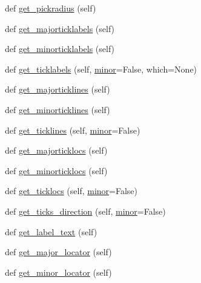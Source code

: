 \begin{DoxyCompactItemize}
def \hyperlink{classmatplotlib_1_1axis_1_1Axis_a15695849391058839321a018f157cbc6}{get\+\_\+pickradius} (self)
\item 
def \hyperlink{classmatplotlib_1_1axis_1_1Axis_a4882da48bc43dd09a7bffa53857cf864}{get\+\_\+majorticklabels} (self)
\item 
def \hyperlink{classmatplotlib_1_1axis_1_1Axis_a10187b66131d717a110edfddeb2d742e}{get\+\_\+minorticklabels} (self)
\item 
def \hyperlink{classmatplotlib_1_1axis_1_1Axis_ae28c6fc8220dc16ef17eef94fd11fb4a}{get\+\_\+ticklabels} (self, \hyperlink{classmatplotlib_1_1axis_1_1Axis_aee64f69c8c9efa6020be9cdefe5dbb49}{minor}=False, which=None)
\item 
def \hyperlink{classmatplotlib_1_1axis_1_1Axis_a388e744fba2303a5961541fef010b3ee}{get\+\_\+majorticklines} (self)
\item 
def \hyperlink{classmatplotlib_1_1axis_1_1Axis_ac2c8891ded3eb3b375d955656da79083}{get\+\_\+minorticklines} (self)
\item 
def \hyperlink{classmatplotlib_1_1axis_1_1Axis_a0c7cf03356111b6d678cf47351910116}{get\+\_\+ticklines} (self, \hyperlink{classmatplotlib_1_1axis_1_1Axis_aee64f69c8c9efa6020be9cdefe5dbb49}{minor}=False)
\item 
def \hyperlink{classmatplotlib_1_1axis_1_1Axis_a22972f3bc63daaeaa6a1a0c249cdb7c3}{get\+\_\+majorticklocs} (self)
\item 
def \hyperlink{classmatplotlib_1_1axis_1_1Axis_a9ac39f662556a99f84dbf2930a54364a}{get\+\_\+minorticklocs} (self)
\item 
def \hyperlink{classmatplotlib_1_1axis_1_1Axis_a56ef3024524d0b2d5acf64f1e805cd99}{get\+\_\+ticklocs} (self, \hyperlink{classmatplotlib_1_1axis_1_1Axis_aee64f69c8c9efa6020be9cdefe5dbb49}{minor}=False)
\item 
def \hyperlink{classmatplotlib_1_1axis_1_1Axis_a783eacedc68213ee0049028681cee753}{get\+\_\+ticks\+\_\+direction} (self, \hyperlink{classmatplotlib_1_1axis_1_1Axis_aee64f69c8c9efa6020be9cdefe5dbb49}{minor}=False)
\item 
def \hyperlink{classmatplotlib_1_1axis_1_1Axis_a9a7813ebd6e79f67fe063e060c5811f6}{get\+\_\+label\+\_\+text} (self)
\item 
def \hyperlink{classmatplotlib_1_1axis_1_1Axis_a482f9779957dcb33a31c85d3894b04ea}{get\+\_\+major\+\_\+locator} (self)
\item 
def \hyperlink{classmatplotlib_1_1axis_1_1Axis_a64e17f35da9f4c68bfd86c570f51c64a}{get\+\_\+minor\+\_\+locator} (self)
\item 

\end{DoxyCompactItemize}
